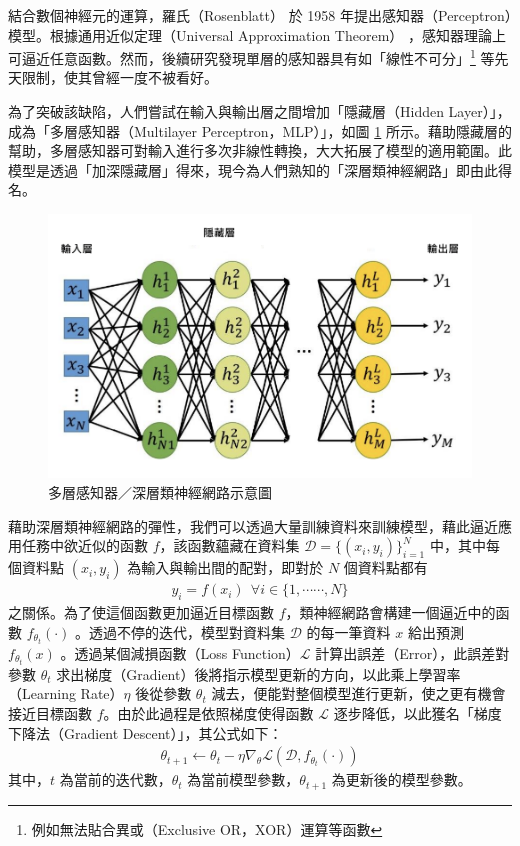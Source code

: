         結合數個神經元的運算，羅氏（Rosenblatt）\cite{rosenblatt_perceptron_1958} 於 1958 年提出感知器（Perceptron）模型。根據通用近似定理（Universal Approximation Theorem）\cite{funahashi_approximate_1989} ，感知器理論上可逼近任意函數。然而，後續研究發現單層的感知器具有如「線性不可分」\footnote{例如無法貼合異或（Exclusive OR，XOR）運算等函數} 等先天限制，使其曾經一度不被看好。

        為了突破該缺陷，人們嘗試在輸入與輸出層之間增加「隱藏層（Hidden Layer）」，成為「多層感知器（Multilayer Perceptron，MLP）」，如圖 \ref{fig:mlp} 所示。藉助隱藏層的幫助，多層感知器可對輸入進行多次非線性轉換，大大拓展了模型的適用範圍。此模型是透過「加深隱藏層」得來，現今為人們熟知的「深層類神經網路」即由此得名。

\begin{figure}
    \centering
    \includegraphics[width=0.8\linewidth]{figures/nnout.png}
    \caption{多層感知器／深層類神經網路示意圖}
    \label{fig:mlp}
\end{figure}
        藉助深層類神經網路的彈性，我們可以透過大量訓練資料來訓練模型，藉此逼近應用任務中欲近似的函數 $f$，該函數蘊藏在資料集 $\mathcal{D} = \{(x_i, y_i)\}_{i=1}^N$ 中，其中每個資料點 $(x_i, y_i)$ 為輸入與輸出間的配對，即對於 $N$ 個資料點都有 
\begin{align}
    y_i = f(x_i) \ \  \forall i \in \{1, \cdots\cdots, N\}
\end{align}
之關係。為了使這個函數更加逼近目標函數 $f$，類神經網路會構建一個逼近中的函數 $f_{\theta_t}(\cdot)$ 。透過不停的迭代，模型對資料集 $\mathcal{D}$ 的每一筆資料 $x$ 給出預測 $f_{\theta_t}(x)$ 。透過某個減損函數（Loss Function）$\mathcal{L}$ 計算出誤差（Error），此誤差對參數 $\theta_t$ 求出梯度（Gradient）後將指示模型更新的方向，以此乘上學習率（Learning Rate）$\eta$ 後從參數  $\theta_t$ 減去，便能對整個模型進行更新，使之更有機會接近目標函數 $f$。由於此過程是依照梯度使得函數 $\mathcal{L}$ 逐步降低，以此獲名「梯度下降法（Gradient Descent）」，其公式如下：
\begin{align}
    \theta_{t+1} \leftarrow \theta_{t} - \eta \nabla_\theta\mathcal{L}(\mathcal{D}, f_{\theta_t}(\cdot))
\end{align}
其中，$t$ 為當前的迭代數，$\theta_t$ 為當前模型參數，$\theta_{t+1}$ 為更新後的模型參數。

